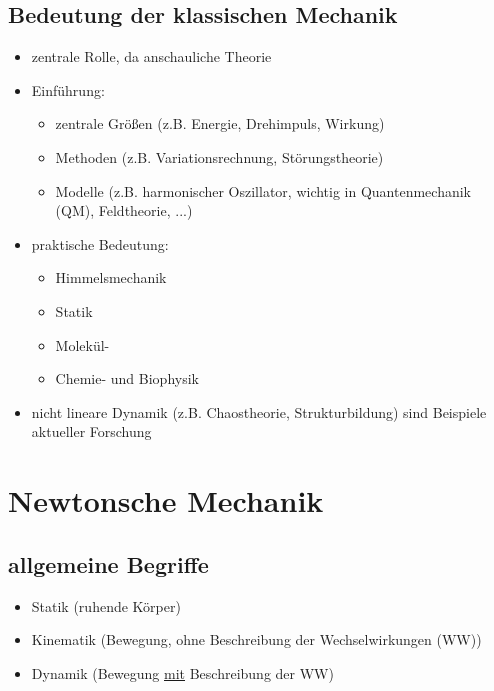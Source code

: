 \documentclass[titlepage,12pt,a4paper,ngerman]{report}
\begin{document}
\section*{Bedeutung der klassischen Mechanik}
\begin{itemize}
\item zentrale Rolle, da anschauliche Theorie
\item Einführung:
\begin{itemize}
	\item zentrale Größen (z.B. Energie, Drehimpuls, Wirkung)
	\item Methoden (z.B. Variationsrechnung, Störungstheorie)
	\item Modelle (z.B. harmonischer Oszillator, wichtig in Quantenmechanik (QM), Feldtheorie, ...)
\end{itemize}
\item praktische Bedeutung:
\begin{itemize}
	\item Himmelsmechanik
	\item Statik
	\item Molekül-
	\item Chemie- und Biophysik
\end{itemize}
\item nicht lineare Dynamik (z.B. Chaostheorie, Strukturbildung) sind Beispiele aktueller Forschung
\end{itemize}

\chapter{Newtonsche Mechanik}
\section{allgemeine Begriffe}
\begin{itemize}
\item Statik (ruhende Körper)
\item Kinematik (Bewegung, ohne Beschreibung der Wechselwirkungen (WW))
\item Dynamik (Bewegung \underline{mit} Beschreibung der WW)
\end{itemize}
\end{document}
